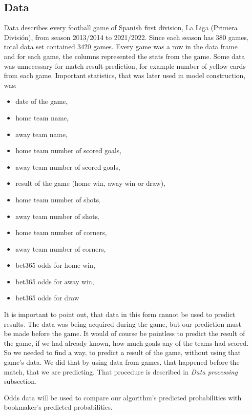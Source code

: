 \documentclass[conference]{IEEEtran}
\begin{document}
\subsection{Data}

Data describes every football game of Spanish first division, La Liga (Primera División), 
from season 2013/2014 to 2021/2022. Since each season has 380 games, total data set contained 
3420 games. Every game was a row in the data frame and for each game, the columns represented 
the stats from the game. Some data was unnecessary for match result prediction, for example
number of yellow cards from each game. Important statistics, that was later used in 
model construction, was:
\begin{itemize}
    \item date of the game,
    \item home team name,
    \item away team name,
    \item home team number of scored goals,
    \item away team number of scored goals,
    \item result of the game (home win, away win or draw),
    \item home team number of shots,
    \item away team number of shots,
    \item home team number of corners,
    \item away team number of corners,
    \item bet365 odds for home win,
    \item bet365 odds for away win,
    \item bet365 odds for draw
\end{itemize}

It is important to point out, that data in this form cannot be used to predict results. 
The data was being acquired during the game, but our prediction must be made before the game.
It would of course be pointless to predict the result of the game, if we had already known, 
how much goals any of the teams had scored. So we needed to find a way, to predict a result 
of the game, without using that game's data. We did that by using data from games, that 
happened before the match, that we are predicting. That procedure is described in \emph{Data
processing} subsection.

Odds data will be used to compare our algorithm's predicted probabilities with bookmaker's
predicted probabilities.
\end{document}
